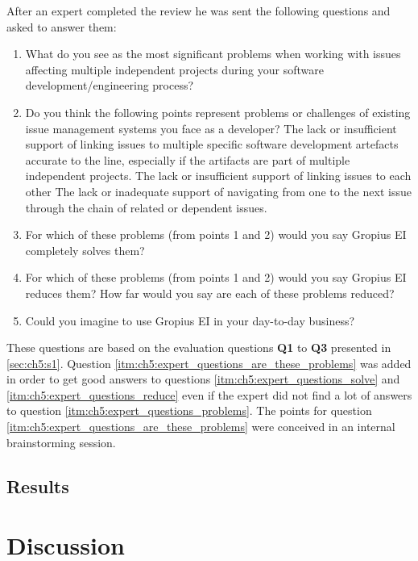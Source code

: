 After an expert completed the review he was sent the following questions and asked to answer them:
\begin{enumerate}
	\item What do you see as the most significant problems when working with issues affecting multiple independent projects during your software development/engineering process? \label{itm:ch5:expert_questions_problems}
	\item Do you think the following points represent problems or challenges of existing issue management systems you face as a developer? \label{itm:ch5:expert_questions_are_these_problems}
	\subitem The lack or insufficient support of linking issues to multiple specific software development artefacts accurate to the line, especially if the artifacts are part of multiple independent projects.
	\subitem The lack or insufficient support of linking issues to each other
	\subitem The lack or inadequate support of navigating from one to the next issue through the chain of related or dependent issues.
	\item For which of these problems (from points 1 and 2) would you say Gropius EI completely solves them? \label{itm:ch5:expert_questions_solve}
	\item For which of these problems (from points 1 and 2) would you say Gropius EI reduces them? \label{itm:ch5:expert_questions_reduce}
	\subitem How far would you say are each of these problems reduced?
	\item Could you imagine to use Gropius EI in your day-to-day business?
\end{enumerate}
These questions are based on the evaluation questions \textbf{Q1} to \textbf{Q3} presented in \cref{sec:ch5:s1}.
Question \ref{itm:ch5:expert_questions_are_these_problems} was added in order to get good answers to questions \ref{itm:ch5:expert_questions_solve} and \ref{itm:ch5:expert_questions_reduce} even if the expert did not find a lot of answers to question \ref{itm:ch5:expert_questions_problems}.
The points for question \ref{itm:ch5:expert_questions_are_these_problems} were conceived in an internal brainstorming session.

\subsection{Results}
\label{ssec:ch5:ss2.2}
\section{Discussion}
\label{sec:ch5:s3}
